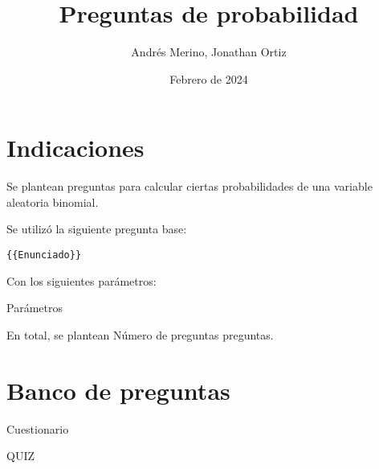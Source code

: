 \documentclass[a4,11pt]{article}
\title{Preguntas de probabilidad}
\author{Andrés Merino, Jonathan Ortiz}
\date{Febrero de 2024}
\begin{document}
\maketitle

\section{Indicaciones}

Se plantean preguntas para calcular ciertas probabilidades de una variable aleatoria binomial.



Se utilizó la siguiente pregunta base:
\begin{lstlisting}[breaklines]
{{Enunciado}}
\end{lstlisting}
\noindent
Con los siguientes parámetros:
\begin{itemize}
{{Parámetros}}
\end{itemize}
En total, se plantean {{Número de preguntas}} preguntas.


\section{Banco de preguntas}

\begin{quiz}{{{Cuestionario}}}

{{QUIZ}}


\end{quiz}
\end{document}
